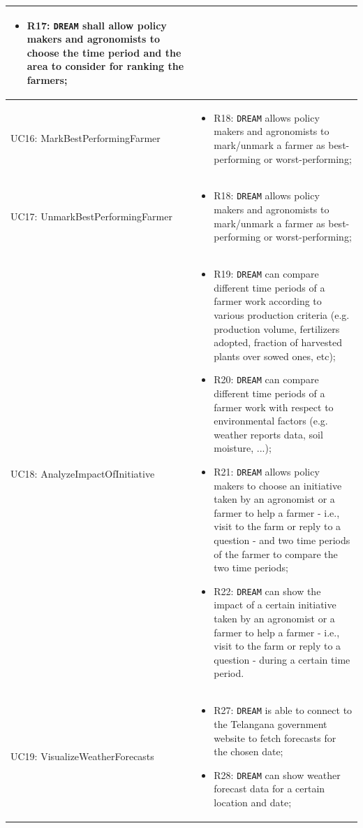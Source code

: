 \documentclass{article}
\begin{document}
\begin{longtable}[c]{|m{}|m{8cm}|}
\begin{itemize}
    \item R17: \verb|DREAM| shall allow policy makers and agronomists to choose the time period and the area to consider for ranking the farmers;
\end{itemize} \\
\hline
UC16: MarkBestPerformingFarmer & 
\begin{itemize}
    \item R18: \verb|DREAM| allows policy makers and agronomists to mark/unmark a farmer as best-performing
or worst-performing;
\end{itemize}\\
\hline
UC17: UnmarkBestPerformingFarmer & 
\begin{itemize}
    \item R18: \verb|DREAM| allows policy makers and agronomists to mark/unmark a farmer as best-performing
or worst-performing;
\end{itemize}\\
\hline
UC18: AnalyzeImpactOfInitiative & 
\begin{itemize}
    \item R19:
\verb|DREAM| can compare different time periods of a farmer work according to
various production criteria (e.g. production volume, fertilizers adopted,
fraction of harvested plants over sowed ones, etc);
\item
R20:
\verb|DREAM| can compare different time periods of a farmer work with respect
to environmental factors (e.g. weather reports data, soil moisture, ...);
\item
R21:
\verb|DREAM| allows policy makers to choose an initiative taken by an
agronomist or a farmer to help a farmer - i.e., visit to the farm or reply
to a question - and two time periods of the farmer to compare the two
time periods;
\item R22:
\verb|DREAM| can show the impact of a certain initiative taken by an agronomist
or a farmer to help a farmer - i.e., visit to the farm or reply to a question
- during a certain time period.
\end{itemize}\\
\hline
UC19: VisualizeWeatherForecasts &
\begin{itemize}
    \item R27: \verb|DREAM| is able to connect to the Telangana government website to fetch forecasts for the chosen date;

    \item R28: \verb|DREAM| can show weather forecast data for a certain location and date;


\end{itemize}
\end{longtable}
\end{document}
